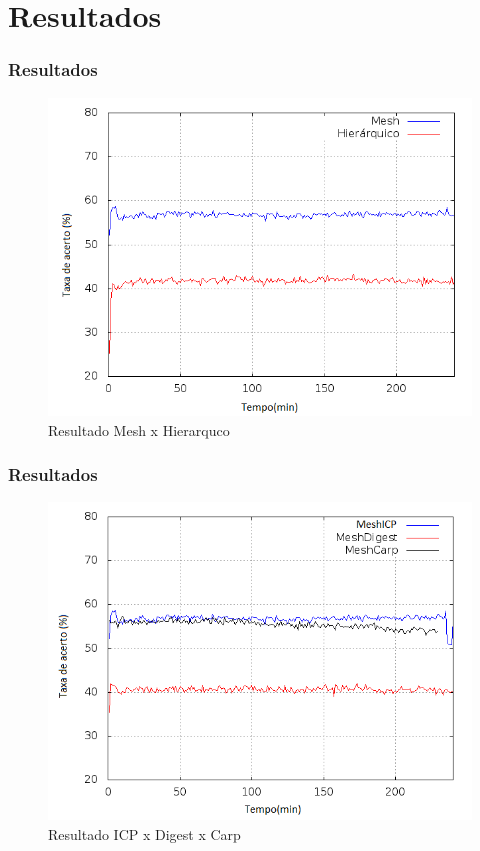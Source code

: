 \documentclass{beamer}
\begin{document}
    \section{Resultados}
    \begin{frame}
     \frametitle{Resultados}     
    \begin{figure}
      \centering
      \includegraphics[scale=0.4]{imagens/meshhierarquico.png}
      \caption{Resultado Mesh x Hierarquco}
    \end{figure}
    \end{frame}

    \begin{frame}
     \frametitle{Resultados}     
     \begin{figure}
      \centering
      \includegraphics[scale=0.4]{imagens/protocolos.png}
      \caption{Resultado ICP x Digest x Carp}
      \end{figure}
    \end{frame}
\end{document}
